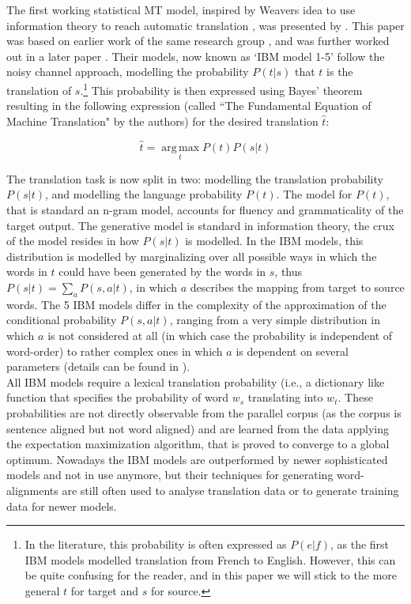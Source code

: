 \documentclass{report}
\theoremstyle{definition}
\theoremstyle{plain}
\begin{document}
The first working statistical MT model, inspired by  Weavers idea to use information theory to reach automatic translation \citep{weaver1955translation}, was presented by \cite{brown1990statistical}. This paper was based on earlier work of the same research group \citep{brown1988statistical}, and was further worked out in a later paper \citep{brown1993mathematics}. Their models, now known as `IBM model 1-5' follow the noisy channel approach, modelling the probability $P(t|s)$ that $t$ is the translation of $s$.\footnote{In the literature, this probability is often expressed as $P(e|f)$, as the first IBM models modelled translation from French to English. However, this can be quite confusing for the reader, and in this paper we will stick to the more general $t$ for target and $s$ for source.} This probability is then expressed using Bayes' theorem resulting in the following expression (called ``The Fundamental Equation of Machine Translation" by the authors) for the desired translation $\hat{t}$:

\[
\hat{t} = \operatorname*{arg\,max}_t P(t)P(s|t)
\]

The translation task is now split in two: modelling the translation probability $P(s|t)$, and modelling the language probability $P(t)$. The model for $P(t)$, that is standard an n-gram model, accounts for fluency and grammaticality of the target output. The generative model is standard in information theory, the crux of the model resides in how $P(s|t)$ is modelled. In the IBM models, this distribution is modelled by marginalizing over all possible ways in which the words in $t$ could have been generated by the words in $s$, thus $P(s|t) = \sum_a P(s,a|t)$, in which $a$ describes the mapping from target to source words. The 5 IBM models differ in the complexity of the approximation of the conditional probability $P(s,a|t)$, ranging from a very simple distribution in which $a$ is not considered at all (in which case the probability is independent of word-order) to rather complex ones in which $a$ is dependent on several parameters (details can be found in \cite{brown1993mathematics}).\\
All IBM models require a lexical translation probability (i.e., a dictionary like function that specifies the probability of word $w_s$ translating into $w_t$. These probabilities are not directly observable from the parallel corpus (as the corpus is sentence aligned but not word aligned) and are learned from the data applying the expectation maximization algorithm, that is proved to converge to a global optimum. Nowadays the IBM models are outperformed by newer sophisticated models and not in use anymore, but their techniques for generating word-alignments are still often used to analyse translation data or to generate training data for newer models.
\end{document}
